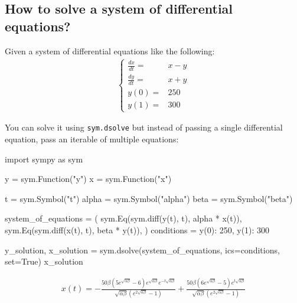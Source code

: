 \subsection{How to solve a system of differential equations?}
\label{\detokenize{tools-for-mathematics/09-differential-equations/why/main:how-to-solve-a-system-of-differential-equations}}

Given a system of differential equations like the following:
\begin{equation*}
\begin{split}
    \begin{cases}
        \frac{dx}{dt} =& x - y\\
        \frac{dy}{dt} =& x + y\\
        y(0) =& 250\\
        y(1) =& 300
    \end{cases}
\end{split}
\end{equation*}

You can solve it using \texttt{sym.dsolve} but instead of passing a single differential
equation, pass an iterable of multiple equations:




\begin{pyin}
import sympy as sym


y = sym.Function("y")
x = sym.Function("x")

t = sym.Symbol("t")
alpha = sym.Symbol("alpha")
beta = sym.Symbol("beta")

system_of_equations = (
    sym.Eq(sym.diff(y(t), t), alpha * x(t)),
    sym.Eq(sym.diff(x(t), t), beta * y(t)),
)
conditions = {y(0): 250, y(1): 300}

y_solution, x_solution = sym.dsolve(system_of_equations, ics=conditions, set=True)
x_solution
\end{pyin}




\begin{equation*}
\begin{split}\displaystyle x{\left(t \right)} = - \frac{50 \beta \left(5 e^{\sqrt{\alpha \beta}} - 6\right) e^{\sqrt{\alpha \beta}} e^{- t \sqrt{\alpha \beta}}}{\sqrt{\alpha \beta} \left(e^{2 \sqrt{\alpha \beta}} - 1\right)} + \frac{50 \beta \left(6 e^{\sqrt{\alpha \beta}} - 5\right) e^{t \sqrt{\alpha \beta}}}{\sqrt{\alpha \beta} \left(e^{2 \sqrt{\alpha \beta}} - 1\right)}\end{split}
\end{equation*}






